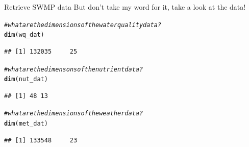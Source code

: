 \documentclass[xcolor=svgnames]{beamer}\usepackage[]{graphicx}\usepackage[]{color}
\makeatletter
\newcommand{\hlcom}[1]{\textcolor[rgb]{0.678,0.584,0.686}{\textit{#1}}}%
\newcommand{\hlstd}[1]{\textcolor[rgb]{0.345,0.345,0.345}{#1}}%
\newcommand{\hlkwd}[1]{\textcolor[rgb]{0.737,0.353,0.396}{\textbf{#1}}}%
\newenvironment{kframe}{%
 \def\at@end@of@kframe{}%
 \ifinner\ifhmode%
  \def\at@end@of@kframe{\end{minipage}}%
  \begin{minipage}{\columnwidth}%
 \fi\fi%
 \def\FrameCommand##1{\hskip\@totalleftmargin \hskip-\fboxsep
 \colorbox{shadecolor}{##1}\hskip-\fboxsep
     \hskip-\linewidth \hskip-\@totalleftmargin \hskip\columnwidth}%
 \MakeFramed {\advance\hsize-\width
   \@totalleftmargin\z@ \linewidth\hsize
   \@setminipage}}%
 {\par\unskip\endMakeFramed%
 \at@end@of@kframe}
\newenvironment{knitrout}{}{} %
\makeatother
\begin{document}
\begin{frame}[containsverbatim]{Retrieve SWMP data}
But don't take my word for it, take a look at the data!
\begin{knitrout}\scriptsize
{}\color{fgcolor}\begin{kframe}
\begin{alltt}
\hlcom{# what are the dimensions of the water quality data?}
\hlkwd{dim}\hlstd{(wq_dat)}
\end{alltt}
\begin{verbatim}
## [1] 132035     25
\end{verbatim}
\begin{alltt}
\hlcom{# what are the dimensons of the nutrient data?}
\hlkwd{dim}\hlstd{(nut_dat)}
\end{alltt}
\begin{verbatim}
## [1] 48 13
\end{verbatim}
\begin{alltt}
\hlcom{# what are the dimensions of the weather data?}
\hlkwd{dim}\hlstd{(met_dat)}
\end{alltt}
\begin{verbatim}
## [1] 133548     23
\end{verbatim}
\end{kframe}
\end{knitrout}
\end{frame}
\end{document}
